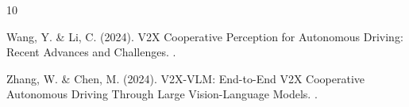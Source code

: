 \documentclass[12pt,a4paper]{article}
\begin{document}

\begin{thebibliography}{10}

Wang, Y. \& Li, C. (2024).
\newblock V2X Cooperative Perception for Autonomous Driving: Recent Advances and Challenges.
.

Zhang, W. \& Chen, M. (2024).
\newblock V2X-VLM: End-to-End V2X Cooperative Autonomous Driving Through Large Vision-Language Models.
.

\end{thebibliography}
\end{document}
